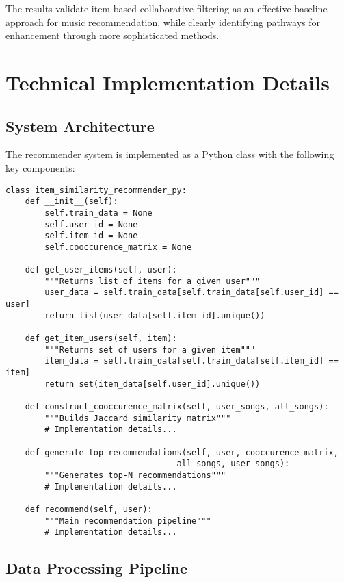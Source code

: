 \documentclass[12pt,a4paper]{article}
\begin{document}
The results validate item-based collaborative filtering as an effective baseline approach for music recommendation, while clearly identifying pathways for enhancement through more sophisticated methods.

\section{Technical Implementation Details}

\subsection{System Architecture}

The recommender system is implemented as a Python class with the following key components:

\begin{lstlisting}[caption=Core Recommender Class Structure]
class item_similarity_recommender_py:
    def __init__(self):
        self.train_data = None
        self.user_id = None
        self.item_id = None
        self.cooccurence_matrix = None
        
    def get_user_items(self, user):
        """Returns list of items for a given user"""
        user_data = self.train_data[self.train_data[self.user_id] == user]
        return list(user_data[self.item_id].unique())
        
    def get_item_users(self, item):
        """Returns set of users for a given item"""
        item_data = self.train_data[self.train_data[self.item_id] == item]
        return set(item_data[self.user_id].unique())
        
    def construct_cooccurence_matrix(self, user_songs, all_songs):
        """Builds Jaccard similarity matrix"""
        # Implementation details...
        
    def generate_top_recommendations(self, user, cooccurence_matrix, 
                                   all_songs, user_songs):
        """Generates top-N recommendations"""
        # Implementation details...
        
    def recommend(self, user):
        """Main recommendation pipeline"""
        # Implementation details...
\end{lstlisting}

\subsection{Data Processing Pipeline}
\end{document}
